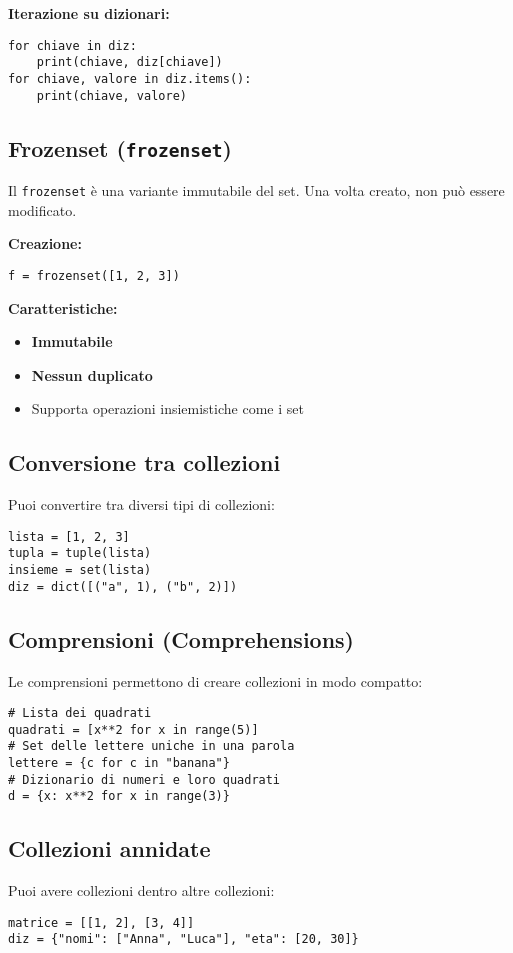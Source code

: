 \documentclass[a4paper,12pt]{article}
\begin{document}
\textbf{Iterazione su dizionari:}
\begin{lstlisting}
for chiave in diz:
    print(chiave, diz[chiave])
for chiave, valore in diz.items():
    print(chiave, valore)
\end{lstlisting}

\subsection*{Frozenset (\texttt{frozenset})}
Il \texttt{frozenset} è una variante immutabile del set. Una volta creato, non può essere modificato.

\textbf{Creazione:}
\begin{lstlisting}
f = frozenset([1, 2, 3])
\end{lstlisting}

\textbf{Caratteristiche:}
\begin{itemize}
    \item \textbf{Immutabile}
    \item \textbf{Nessun duplicato}
    \item Supporta operazioni insiemistiche come i set
\end{itemize}

\subsection*{Conversione tra collezioni}
Puoi convertire tra diversi tipi di collezioni:
\begin{lstlisting}
lista = [1, 2, 3]
tupla = tuple(lista)
insieme = set(lista)
diz = dict([("a", 1), ("b", 2)])
\end{lstlisting}

\subsection*{Comprensioni (Comprehensions)}
Le comprensioni permettono di creare collezioni in modo compatto:
\begin{lstlisting}
# Lista dei quadrati
quadrati = [x**2 for x in range(5)]
# Set delle lettere uniche in una parola
lettere = {c for c in "banana"}
# Dizionario di numeri e loro quadrati
d = {x: x**2 for x in range(3)}
\end{lstlisting}

\subsection*{Collezioni annidate}
Puoi avere collezioni dentro altre collezioni:
\begin{lstlisting}
matrice = [[1, 2], [3, 4]]
diz = {"nomi": ["Anna", "Luca"], "eta": [20, 30]}
\end{lstlisting}
\end{document}
